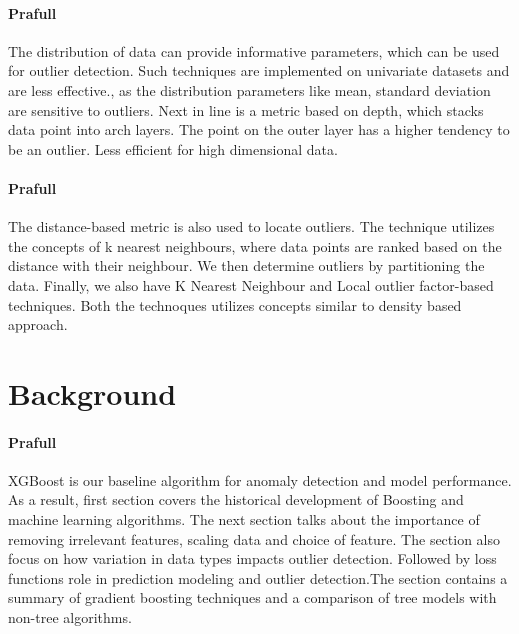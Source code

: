 \documentclass[runningheads]{llncs}
\begin{document}
\paragraph{Prafull} The distribution of data can provide informative parameters,  which can be used for outlier detection. Such techniques are implemented on univariate datasets and are less effective., as the distribution parameters like mean, standard deviation are sensitive to outliers. 
Next in line is a metric based on depth, which stacks data point into arch layers. The point on the outer layer has a higher tendency to be an outlier. Less efficient for high dimensional data.

\paragraph{Prafull} The distance-based metric is also used to locate outliers. The technique utilizes the concepts of k nearest neighbours, where data points are ranked based on the distance with their neighbour. We then determine outliers by partitioning the data.  Finally, we also have K Nearest Neighbour and Local outlier factor-based techniques. Both the technoques utilizes concepts similar to density based approach.







\section{Background}
\paragraph{Prafull} XGBoost is our baseline algorithm for anomaly detection and model performance. As a result, first section covers the historical development of Boosting and machine learning algorithms. The next section talks about the importance of removing irrelevant features, scaling data and choice of feature. The section also focus on how variation in data types impacts outlier detection. Followed by loss functions role in prediction modeling and outlier detection.The section contains a summary of gradient boosting techniques and a comparison of tree models with non-tree algorithms.
\end{document}
